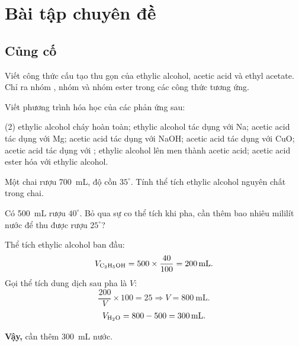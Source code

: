 \section{Bài tập chuyên đề}

\subsection{Củng cố}

\begin{tuluyen}
Viết công thức cấu tạo thu gọn của ethylic alcohol, acetic acid và ethyl acetate. Chỉ ra nhóm , nhóm  và nhóm ester trong các công thức tương ứng.
\end{tuluyen}

\begin{tuluyen}
Viết phương trình hóa học của các phản ứng sau:
\begin{tasks}(2)
\task ethylic alcohol cháy hoàn toàn;
\task ethylic alcohol tác dụng với Na;
\task acetic acid tác dụng với Mg;
\task acetic acid tác dụng với NaOH;
\task acetic acid tác dụng với CuO;
\task acetic acid tác dụng với ;
\task ethylic alcohol lên men thành acetic acid;
\task acetic acid ester hóa với ethylic alcohol.
\end{tasks}
\end{tuluyen}

\begin{tuluyen}
Một chai rượu \SI{700}{\milli\liter}, độ cồn $35^\circ$. Tính thể tích ethylic alcohol nguyên chất trong chai.
\end{tuluyen}

\begin{tuluyen}
Có \SI{500}{\milli\liter} rượu $40^\circ$. Bỏ qua sự co thể tích khi pha, cần thêm bao nhiêu mililít nước để thu được rượu $25^\circ$?
\begin{loigiaiBT}
Thể tích ethylic alcohol ban đầu:
\[
V_{\ce{C2H5OH}}=500\times\frac{40}{100}=\SI{200}{\milli\liter}.
\]
Gọi thể tích dung dịch sau pha là $V$:
\[
\frac{200}{V}\times100=25\Rightarrow V=\SI{800}{\milli\liter}.
\]
\[
V_{\ce{H2O}}=800-500=\SI{300}{\milli\liter}.
\]

\textbf{Vậy,} cần thêm \SI{300}{\milli\liter} nước.
\end{loigiaiBT}
\end{tuluyen}

